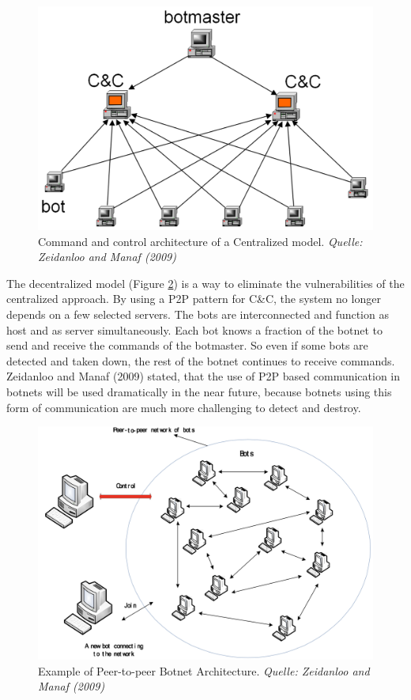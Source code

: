 \begin{figure}[ht]
\begin{center} \includegraphics[scale=0.3]{Talk11/CC-centralized} \end{center}
\caption{Command and control architecture of a Centralized model. \textit{Quelle: Zeidanloo and Manaf (2009)}}
\label{fig:centralized}
\end{figure}

The decentralized model (Figure \ref{fig:decentralized}) is a way to eliminate the vulnerabilities of the centralized approach. By using a P2P pattern for C\&C, the system no longer depends on a few selected servers. The bots are interconnected and function as host and as server simultaneously. Each bot knows a fraction of the botnet to send and receive the commands of the botmaster. So even if some bots are detected and taken down, the rest of the botnet continues to receive commands. Zeidanloo and Manaf (2009) stated, that the use of P2P based communication in botnets will be used dramatically in the near future, because botnets using this form of communication are much more challenging to detect and destroy. \cite{Zeidanloo09}

\begin{figure}[ht]
\begin{center} \includegraphics[scale=0.3]{Talk11/CC-P2P} \end{center}
\caption{Example of Peer-to-peer Botnet Architecture. \textit{Quelle: Zeidanloo and Manaf (2009)}}
\label{fig:decentralized}
\end{figure}

